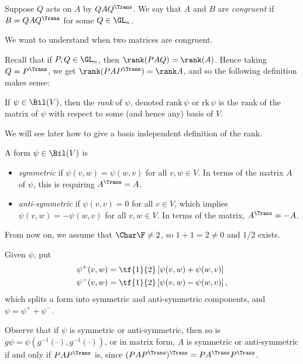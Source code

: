 \begin{definition}
	Suppose $Q$ acts on $A$ by $QAQ^\Trans$. We say that $A$ and $B$ are \emph{congruent} if $B=QAQ^\Trans$ for some $Q\in\GL_n$. %
\end{definition}

We want to understand when two matrices are congruent.

Recall that if $P,Q \in\GL_n$, then $\rank(PAQ) = \rank(A)$. Hence taking $Q = P^\Trans$, we get $\rank(PAP^\Trans) = \rank A$, and so the following definition makes sense:

\begin{definition}
	If $\psi \in\Bil(V)$, then the \emph{rank} of $\psi$, denoted $\text{rank}\, \psi$ or $\text{rk}\,\psi$ is the rank of the matrix of $\psi$ with respect to some (and hence any) basis of $V$. %
\end{definition}

We will see later how to give a basis independent definition of the rank.

\begin{definition}
	A form $\psi\in\Bil(V)$ is %
	\begin{itemize}
		\shortskip
		\item \emph{symmetric} if $\psi(v,w)=\psi(w,v)$ for all $v,w\in V$. In terms of the matrix $A$ of $\psi$, this is requiring $A^\Trans=A$. %
		\item \emph{anti-symmetric} if $\psi(v,v)=0$ for all $v\in V$, which implies $\psi(v,w) = -\psi(w,v)$ for all $v,w\in V$. In terms of the matrix,  $A^\Trans=-A$. %
	\end{itemize}
\end{definition}

From now on, we assume that $\Char\F\neq 2$, so $1+1=2\neq 0$ and $1/2$ exists.

Given $\psi$, put
\begin{align*}
	\psi^+(v,w) &= \tf{1}{2}\left[ \psi(v,w) + \psi(w,v) \right] \\
	\psi^-(v,w) &= \tf{1}{2}\left[ \psi(v,w) - \psi(w,v) \right],
\end{align*}
which splits a form into symmetric and anti-symmetric components, and $\psi=\psi^+ +\psi^-$.

Observe that if $\psi$ is symmetric or anti-symmetric, then so is $g\psi = \psi(g^{-1}(\cdot), g^{-1}(\cdot))$, or in matrix form, $A$ is symmetric or anti-symmetric if and only if $PAP^\Trans$ is, since $(PAP^\Trans)^\Trans = PA^\Trans P^\Trans$.

